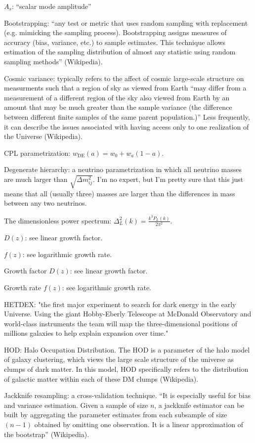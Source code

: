 \documentclass[11pt]{article}
\begin{document}
$A_s$: ``scalar mode amplitude''

Bootstrapping: ``any test or metric that uses random sampling with replacement
(e.g. mimicking the sampling process). Bootstrapping assigns measures of
accuracy (bias, variance, etc.) to sample estimates. This technique allows
estimation of the sampling distribution of almost any statistic using random
sampling methods'' (Wikipedia).

Cosmic variance: typically refers to the affect of cosmic large-scale structure
on measurments such that a region of sky as viewed from Earth ``may differ from
a measurement of a different region of the sky also viewed from Earth by an
amount that may be much greater than the sample variance (the difference
between different finite samples of the same parent population.)'' Less
frequently, it can describe the issues associated with having access only to
one realization of the Universe (Wikipedia). 

CPL parametrization: $w_\text{DE}(a) = w_0 + w_a (1 - a)$.

Degenerate hierarchy: a neutrino parametrization in which all
neutrino masses are much larger than $\sqrt{\Delta m_{ij}^2}$. I'm no expert,
but I'm pretty sure that this just means that all (usually three) masses are
larger than
the differences in mass between any two neutrinos.

The dimensionless power spectrum: $\Delta_L^2(k) = \frac{k^3 P_L(k)}{2 \pi^2}$.

$D(z)$: see linear growth factor.

$f(z)$: see logarithmic growth rate.

Growth factor $D(z)$: see linear growth factor.

Growth rate $f(z)$: see logarithmic growth rate.

HETDEX: "the first major experiment to search for dark energy in the
early Universe. Using the giant Hobby-Eberly Telescope at McDonald Observatory
and world-class instruments the team will map the three-dimensional positions
of millions galaxies to help explain expansion over time."

HOD: Halo Occupation Distribution. The HOD is a parameter of the halo model of
galaxy clustering, which views the large scale structure of the universe as
clumps of dark matter. In this model, HOD specifically refers to the
distribution of galactic matter within each of these DM clumps (Wikipedia).

Jackknife resampling: a cross-validation technique. ``It is especially useful
for bias and variance estimation. Given a sample of size $n$, a jackknife
estimator can be built by aggregating the parameter estimates from each
subsample of size $(n - 1)$ obtained by omitting one observation. It is a
linear approximation of the bootstrap'' (Wikipedia).
\end{document}
